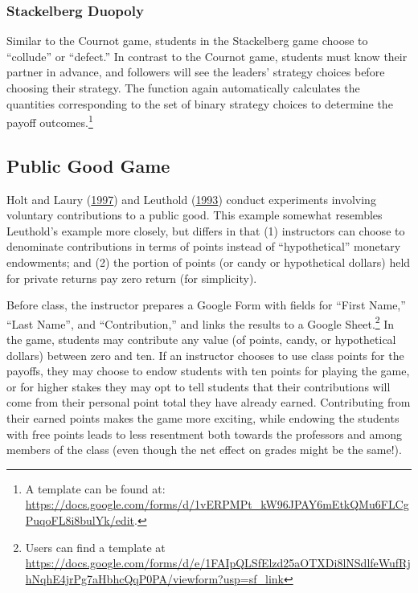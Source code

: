 \documentclass[
]{article}
\begin{document}
\hypertarget{stackelberg-duopoly}{%
\subsubsection{Stackelberg Duopoly}\label{stackelberg-duopoly}}

Similar to the Cournot game, students in the Stackelberg game choose to
``collude'' or ``defect.'' In contrast to the Cournot game, students
must know their partner in advance, and followers will see the leaders'
strategy choices before choosing their strategy. The function again
automatically calculates the quantities corresponding to the set of
binary strategy choices to determine the payoff outcomes.\footnote{A
  template can be found at:\\
  \url{https://docs.google.com/forms/d/1vERPMPt_kW96JPAY6mEtkQMu6FLCgPuqoFL8i8bulYk/edit}.}

\hypertarget{public-good-game}{%
\subsection{Public Good Game}\label{public-good-game}}

Holt and Laury (\protect\hyperlink{ref-holt1997}{1997}) and Leuthold
(\protect\hyperlink{ref-leuthold1993}{1993}) conduct experiments
involving voluntary contributions to a public good. This example
somewhat resembles Leuthold's example more closely, but differs in that
(1) instructors can choose to denominate contributions in terms of
points instead of ``hypothetical'' monetary endowments; and (2) the
portion of points (or candy or hypothetical dollars) held for private
returns pay zero return (for simplicity).

Before class, the instructor prepares a Google Form with fields for
``First Name,'' ``Last Name'', and ``Contribution,'' and links the
results to a Google Sheet.\footnote{Users can find a template at
  \url{https://docs.google.com/forms/d/e/1FAIpQLSfElzd25aOTXDi8lNSdlfeWufRjhNqhE4jrPg7aHbhcQqP0PA/viewform?usp=sf_link}}
In the game, students may contribute any value (of points, candy, or
hypothetical dollars) between zero and ten. If an instructor chooses to
use class points for the payoffs, they may choose to endow students with
ten points for playing the game, or for higher stakes they may opt to
tell students that their contributions will come from their personal
point total they have already earned. Contributing from their earned
points makes the game more exciting, while endowing the students with
free points leads to less resentment both towards the professors and
among members of the class (even though the net effect on grades might
be the same!).
\end{document}
